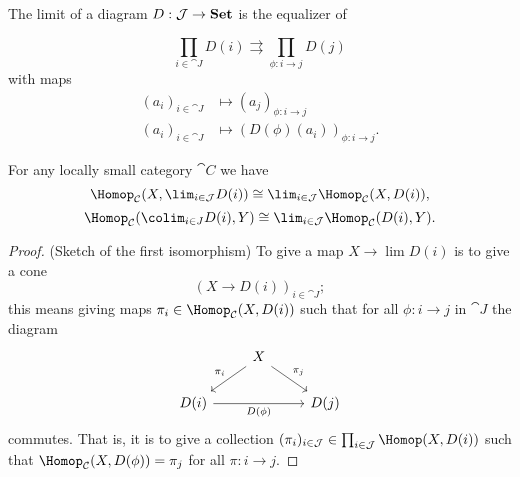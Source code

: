 \documentclass[../main.tex]{subfiles}
\begin{document}
\begin{rmk}\label{rmk:limits-are-products-and-equalisers-in-set}
	The limit of a diagram $D: \mathcal{J} \to \mathbf{Set}$ is the equalizer of

	\[
		\prod_{i \in \cat J} D(i) \rightrightarrows \prod_{\phi: i \to j} D(j)
	\]
	with maps
	\begin{align*}
		(a_i)_{i \in \cat J} & \mapsto (a_j)_{\phi: i \to j} \\
		(a_i)_{i \in \cat J} & \mapsto (D(\phi)(a_i))_{\phi: i \to j}.
	\end{align*}
\end{rmk}


\begin{cor}\label{cor:hom-limits-pass-to-set}
	For any locally small category $\cat C$ we have
    \[
        \Hom_{\cat C}(X, \lim_{i \in \cat J}D(i)) \cong \lim_{i \in \cat J} \Hom_{\cat C}(X, D(i)),
    \]
    \[
         \Hom_{\cat C}(\colim_{i \in J} D(i), Y) \cong \lim_{i \in \cat J} \Hom_{\cat C}(D(i), Y).
    \]
\end{cor}
\begin{proof}(Sketch of the first isomorphism)
To give a map $X \to \lim D(i)$ is to give a cone $$(X \to D(i))_{i \in \cat J};$$ this means giving maps $\pi_i \in \Hom_{\cat C}(X, D(i))$ such that for all $\phi: i \to j$ in $\cat J$ the diagram
\[\begin{tikzcd}
                            & X \arrow[ld, "\pi_i"'] \arrow[rd, "\pi_j"] &      \\
D(i) \arrow[rr, "D(\phi)"'] &                                            & D(j)
\end{tikzcd}\] commutes. That is, it is to give a collection $(\pi_i)_{i \in \cat J} \in \prod_{i \in \cat J} \Hom(X, D(i))$ such that $\Hom_{\cat C}(X, D(\phi)) = \pi_j$ for all $\pi: i \to j$.

\end{proof}
\end{document}
